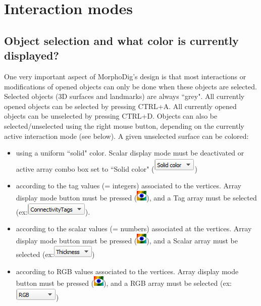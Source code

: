 \chapter{Interaction modes}
\minitoc  

 \section{Object selection and what color is currently displayed? }
One very important aspect of MorphoDig's design is that most interactions or modifications of opened objects can only be done when these objects are selected. 
Selected objects (3D surfaces and landmarks) are always ``grey". All currently opened objects can be selected by pressing CTRL+A. All currently opened objects can be unselected by pressing CTRL+D. Objects can also be selected/unselected using the right mouse button, depending on the currently active interaction mode (see below). A given unselected surface can be colored: 

\begin{itemize}
\item using a uniform ``solid" color. Scalar display mode must be deactivated or active array combo box set to ``Solid color" (\includegraphics[scale=0.5]{images/04/scalarcombo_solidcolor.png})
\item according to the tag values (= integers) associated to the vertices. Array display mode button must be pressed (\includegraphics[scale=0.7]{images/04/show_color_scale.png}), and a Tag array must be selected (ex:\includegraphics[scale=0.5]{images/04/scalarcombo_tag.png}).
\item	according to the scalar values (= numbers) associated at the vertices. Array display mode button must be pressed (\includegraphics[scale=0.7]{images/04/show_color_scale.png}), and a Scalar array must be selected (ex:\includegraphics[scale=0.5]{images/04/scalarcombo_scalar.png})
\item	according to RGB values associated to the vertices. Array display mode button must be pressed (\includegraphics[scale=0.7]{images/04/show_color_scale.png}), and a RGB array must be selected (ex:\includegraphics[scale=0.5]{images/04/scalarcombo_rgb.png}) 
\end{itemize}





